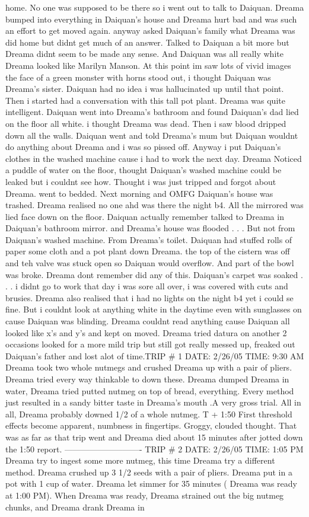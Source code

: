 \documentclass[12pt]{book}
\begin{document}
home. No one was supposed to be there so i went out to talk to Daiquan. Dreama bumped into everything in Daiquan's house and Dreama hurt bad and was such an effort to get moved again. anyway asked Daiquan's family what Dreama was did home but didnt get much of an answer. Talked to Daiquan a bit more but Dreama didnt seem to be made any sense. And Daiquan was all really white Dreama looked like Marilyn Manson. At this point im saw lots of vivid images the face of a green monster with horns stood out, i thought Daiquan was Dreama's sister. Daiquan had no idea i was hallucinated up until that point. Then i started had a conversation with this tall pot plant. Dreama was quite intelligent. Daiquan went into Dreama's bathroom and found Daiquan's dad lied on the floor all white. i thought Dreama was dead. Then i saw blood dripped down all the walls. Daiquan went and told Dreama's mum but Daiquan wouldnt do anything about Dreama and i was so pissed off. Anyway i put Daiquan's clothes in the washed machine cause i had to work the next day. Dreama Noticed a puddle of water on the floor, thought Daiquan's washed machine could be leaked but i couldnt see how. Thought i was just tripped and forgot about Dreama. went to bedded. Next morning and OMFG Daiquan's house was trashed. Dreama realised no one ahd was there the night b4. All the mirrored was lied face down on the floor. Daiquan actually remember talked to Dreama in Daiquan's bathroom mirror. and Dreama's house was flooded . . .  But not from Daiquan's washed machine. From Dreama's toilet. Daiquan had stuffed rolls of paper some cloth and a pot plant down Dreama. the top of the cistern was off and teh valve was stuck open so Daiquan would overflow. And part of the bowl was broke. Dreama dont remember did any of this. Daiquan's carpet was soaked . . .  i didnt go to work that day i was sore all over, i was covered with cuts and brusies. Dreama also realised that i had no lights on the night b4 yet i could se fine. But i couldnt look at anything white in the daytime even with sunglasses on cause Daiquan was blinding. Dreama couldnt read anything cause Daiquan all looked like x's and y's and kept on moved. Dreama tried datura on another 2 occasions looked for a more mild trip but still got really messed up, freaked out Daiquan's father and lost alot of time.TRIP \# 1 DATE: 2/26/05 TIME: 9:30 AM Dreama took two whole nutmegs and crushed Dreama up with a pair of pliers. Dreama tried every way thinkable to down these. Dreama dumped Dreama in water, Dreama tried putted nutmeg on top of bread, everything. Every method just resulted in a sandy bitter taste in Dreama's mouth .A very gross trial. All in all, Dreama probably downed 1/2 of a whole nutmeg. T + 1:50 First threshold effects become apparent, numbness in fingertips. Groggy, clouded thought. That was as far as that trip went and Dreama died about 15 minutes after jotted down the 1:50 report. ---------------------------- TRIP \# 2 DATE: 2/26/05 TIME: 1:05 PM Dreama try to ingest some more nutmeg, this time Dreama try a different method. Dreama crushed up 3 1/2 seeds with a pair of pliers. Dreama put in a pot with 1 cup of water. Dreama let simmer for 35 minutes ( Dreama was ready at 1:00 PM). When Dreama was ready, Dreama strained out the big nutmeg chunks, and Dreama drank Dreama in 
\end{document}
